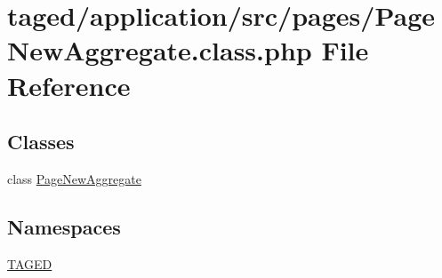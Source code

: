 \hypertarget{_page_new_aggregate_8class_8php}{}\section{taged/application/src/pages/\+Page\+New\+Aggregate.class.\+php File Reference}
\label{_page_new_aggregate_8class_8php}
\subsection*{Classes}
\begin{DoxyCompactItemize}
\item 
class \hyperlink{class_page_new_aggregate}{Page\+New\+Aggregate}
\end{DoxyCompactItemize}
\subsection*{Namespaces}
\begin{DoxyCompactItemize}
\item 
 \hyperlink{namespace_t_a_g_e_d}{T\+A\+G\+ED}
\end{DoxyCompactItemize}
